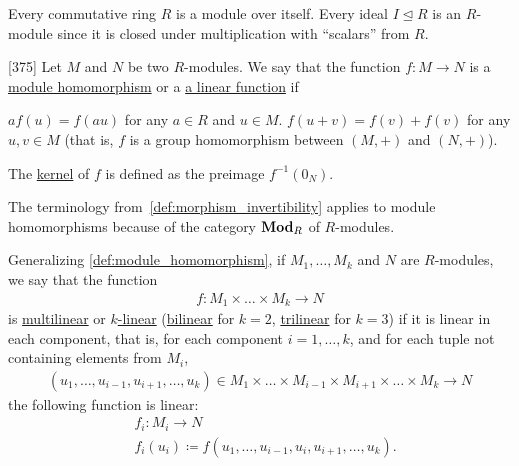 \begin{example}\label{ex:module/ideal}
  Every commutative ring $R$ is a module over itself. Every ideal $I \unlhd R$ is an $R$-module since it is closed under multiplication with \enquote{scalars} from $R$.
\end{example}

\begin{definition}\label{def:module_homomorphism}\cite{Knapp2016BAlg}[375]
  Let $M$ and $N$ be two $R$-modules. We say that the function $f: M \to N$ is a \uline{module homomorphism} or a \uline{a linear function} if
  \begin{description}
     $a f(u) = f(a u)$ for any $a \in R$ and $u \in M$.
     $f(u + v) = f(v) + f(v)$ for any $u, v \in M$ (that is, $f$ is a group homomorphism between $(M, +)$ and $(N, +)$).
  \end{description}

  The \uline{kernel} of $f$ is defined as the preimage $f^{-1}(0_N)$.

  The terminology from~\cref{def:morphism_invertibility} applies to module homomorphisms because of the category $\operatorname{\mathbf{Mod}}_R$ of $R$-modules.
\end{definition}

\begin{definition}\label{def:multilinear_function}
  Generalizing \cref{def:module_homomorphism}, if $M_1, \ldots, M_k$ and $N$ are $R$-modules, we say that the function
  \begin{align*}
    f: M_1 \times \ldots \times M_k \to N
  \end{align*}
  is \uline{multilinear} or \uline{$k$-linear} (\uline{bilinear} for $k = 2$, \uline{trilinear} for $k = 3$) if it is linear in each component, that is, for each component $i = 1, \ldots, k$, and for each tuple not containing elements from $M_i$,
  \begin{align*}
    (u_1, \ldots, u_{i-1}, u_{i+1}, \ldots, u_k) \in M_1 \times \ldots \times M_{i-1} \times M_{i+1} \times \ldots \times M_k \to N
  \end{align*}
  the following function is linear:
  \begin{align*}
    &f_i: M_i \to N \\
    &f_i(u_i) \coloneqq f(u_1, \ldots, u_{i-1}, u_i, u_{i+1}, \ldots, u_k).
  \end{align*}
\end{definition}

